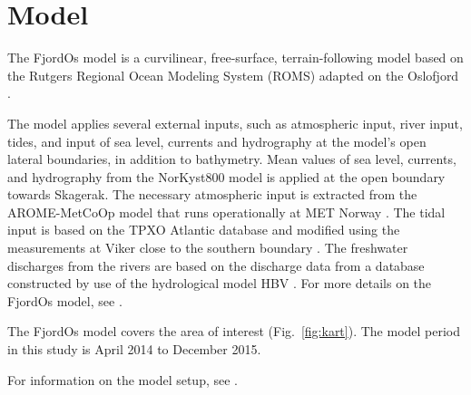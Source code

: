 \section{Model}

The FjordOs model is a curvilinear, free-surface, terrain-following model based on the Rutgers Regional Ocean Modeling System (ROMS) \citep{haidv:etal:2008,shche:mcwil:2003,shche:mcwil:2005,shche:mcwil:2009} adapted on the Oslofjord \citep{roed:etal:2016}. 

The model applies several external inputs, such as atmospheric input, river input, tides, and input of sea level, currents and hydrography at the model's open lateral boundaries, in addition to bathymetry. Mean values of sea level, currents, and hydrography from the NorKyst800 model \citep{albre:etal:2011} is applied at the open boundary towards Skagerak. The necessary atmospheric input is extracted from the AROME-MetCoOp model that runs operationally at MET Norway \citep{mulle:etal:2015}. The tidal input is based on the TPXO Atlantic database \citep{egber:erofe:2002} and modified using the measurements at Viker close to the southern boundary \cite[]{hjelm:etal:2017}. The freshwater discharges from the rivers are based on the discharge data from a database constructed by use of the hydrological model HBV \citep{beldr:etal:2003}. For more details on the FjordOs model, see \cite{roed:etal:2016}.

The FjordOs model covers the area of interest (Fig.~\ref{fig:kart}). The model period in this study is April 2014 to December 2015.

For information on the model setup, see \cite[]{roed:etal:2016}.


\newpage
